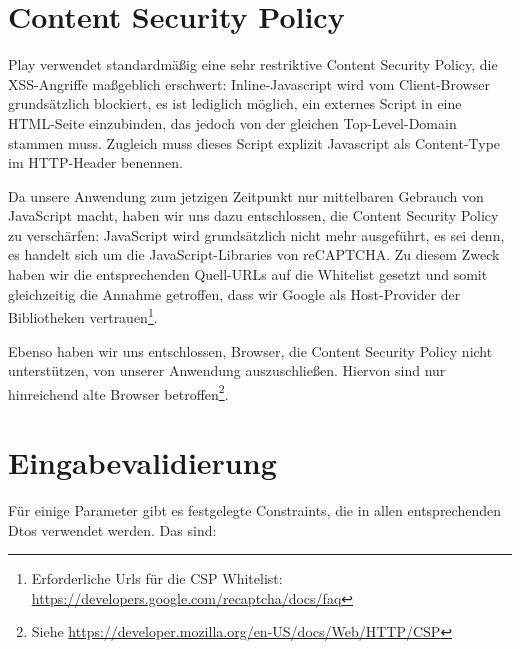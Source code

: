 \documentclass[12pt,DIV14,BCOR10mm,a4paper,parskip=half-,headsepline,headinclude,english,ngerman,bibliography=totocnumbered]{scrreprt}
\begin{document}
\section{Content Security Policy}
Play verwendet standardmäßig eine sehr restriktive Content Security Policy, die XSS-Angriffe maßgeblich erschwert: Inline-Javascript wird vom Client-Browser grundsätzlich blockiert, es ist lediglich möglich, ein externes Script in eine HTML-Seite einzubinden, das jedoch von der gleichen Top-Level-Domain stammen muss. Zugleich muss dieses Script explizit Javascript als Content-Type im HTTP-Header benennen.

Da unsere Anwendung zum jetzigen Zeitpunkt nur mittelbaren Gebrauch von JavaScript macht, haben wir uns dazu entschlossen, die Content Security Policy zu verschärfen: JavaScript wird grundsätzlich nicht mehr ausgeführt, es sei denn, es handelt sich um die JavaScript-Libraries von reCAPTCHA. Zu diesem Zweck haben wir die entsprechenden Quell-URLs auf die Whitelist gesetzt und somit gleichzeitig die Annahme getroffen, dass wir Google als Host-Provider der Bibliotheken vertrauen\footnote{Erforderliche Urls für die CSP Whitelist: \url{https://developers.google.com/recaptcha/docs/faq}}.

Ebenso haben wir uns entschlossen, Browser, die Content Security Policy nicht unterstützen, von unserer Anwendung auszuschließen. Hiervon sind nur hinreichend alte Browser betroffen\footnote{Siehe  \url{https://developer.mozilla.org/en-US/docs/Web/HTTP/CSP}}.

\section{Eingabevalidierung}
Für einige Parameter gibt es festgelegte Constraints, die in allen entsprechenden Dtos verwendet werden. Das sind:
\end{document}
